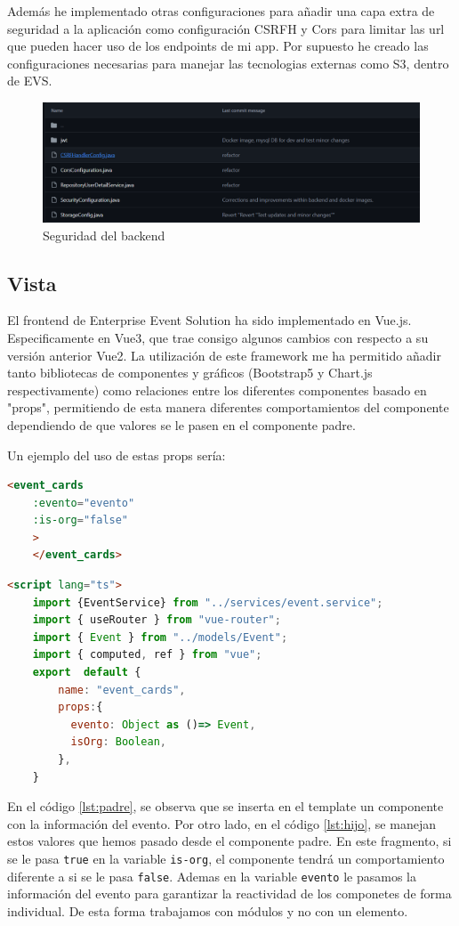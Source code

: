 Además he implementado otras configuraciones para añadir una capa extra de seguridad a la aplicación como configuración CSRFH y Cors para limitar las url 
que pueden hacer uso de los endpoints de mi app. Por supuesto he creado las configuraciones necesarias para manejar las tecnologias externas como S3, dentro de 
EVS.
\begin{figure}[h]
    \centering
    \includegraphics[width=1\textwidth]{security.png} 
    \caption{Seguridad del backend}
    \label{fig:securityClasses}
\end{figure}

\subsection{Vista}
El frontend de Enterprise Event Solution ha sido implementado en Vue.js. Especificamente en Vue3, que trae consigo algunos cambios con respecto a su versión
anterior Vue2. La utilización de este framework me ha permitido añadir tanto bibliotecas de componentes y gráficos (Bootstrap5 y Chart.js respectivamente)
como relaciones entre los diferentes componentes basado en "props", permitiendo de esta manera diferentes comportamientos del componente dependiendo de
que valores se le pasen en el componente padre.

Un ejemplo del uso de estas props sería:
\myvuestyle
\begin{lstlisting}[language=HTML, caption=Ejemplo del Padre, label=lst:padre]
    <event_cards
    :evento="evento"
    :is-org="false"
    >
    </event_cards>
\end{lstlisting}
\myvuestyle
\begin{lstlisting}[language=HTML, caption=Ejemplo del Hijo, label=lst:hijo]
    <script lang="ts">
    import {EventService} from "../services/event.service";
    import { useRouter } from "vue-router";
    import { Event } from "../models/Event";
    import { computed, ref } from "vue";
    export  default {
        name: "event_cards",
        props:{
          evento: Object as ()=> Event,
          isOrg: Boolean,
        },
    }
\end{lstlisting}

En el código \ref{lst:padre}, se observa que se inserta en el template un componente con la información del evento. Por otro lado, en el código 
\ref{lst:hijo}, se manejan estos valores que hemos pasado desde el componente padre. En este fragmento, si se le pasa \texttt{true} en la variable 
\texttt{is-org}, el componente tendrá un comportamiento diferente a si se le pasa \texttt{false}. Ademas en la variable \texttt{evento} le pasamos la información
del evento para garantizar la reactividad de los componetes de forma individual. De esta forma trabajamos con módulos y no con un elemento.